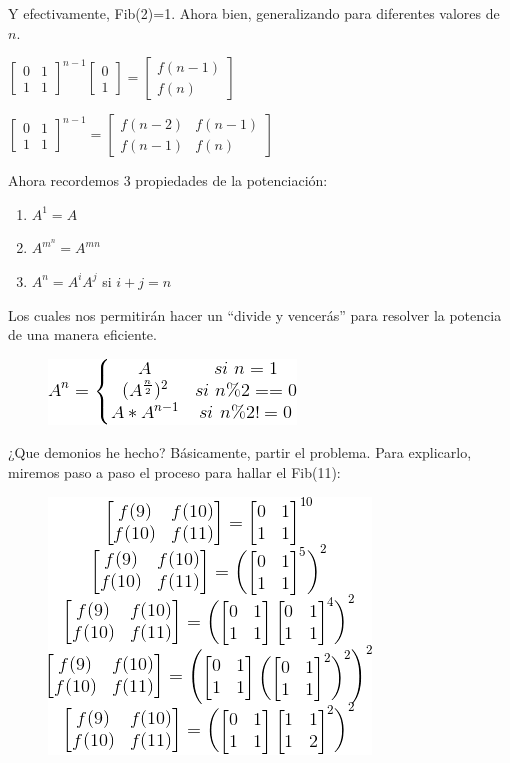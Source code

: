 Y efectivamente, Fib(2)=1. Ahora bien, generalizando para diferentes valores de $n$.


$
\begin{bmatrix}
	0 & 1 \\ 
	1 & 1
\end{bmatrix}
^{n-1}
\begin{bmatrix}
	0  \\ 
	1
\end{bmatrix}
=
\begin{bmatrix}
	f(n-1) \\ 
	f(n)
\end{bmatrix} 
$

$
\begin{bmatrix}
	0 & 1 \\ 
	1 & 1
\end{bmatrix}
^{n-1}
=
\begin{bmatrix}
	f(n-2) & f(n-1) \\ 
	f(n-1) & f(n)
\end{bmatrix} 
$



Ahora recordemos 3 propiedades de la potenciación:

\begin{enumerate}
	\item $A^{1}=A$
	\item $A^{m^{n}}=A^{mn}$ 
	\item $A^{n}=A^{i}A^{j}$ si $i+j=n$
\end{enumerate}

Los cuales nos permitirán hacer un “divide y vencerás” para resolver la potencia de una manera eficiente.

\begin{figure}[h]
	\centering
	\includegraphics[width=0.3\linewidth]{img/potencias}
	\label{fig:potencias}
\end{figure}

¿Que demonios he hecho? Básicamente, partir el problema. Para explicarlo, miremos paso a paso el proceso para hallar el Fib(11):


\begin{figure}[h]
	\centering
	\includegraphics[width=0.3\linewidth]{img/sola}
	\label{fig:solucion3}
\end{figure}


